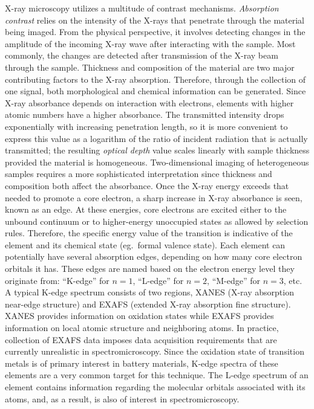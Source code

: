 \documentclass[journal=cmatex,manuscript=perspective]{achemso}
\begin{document}
X-ray microscopy utilizes a multitude of contrast
mechanisms. \emph{Absorption contrast} relies on the intensity of the X-rays
that penetrate through the material being imaged. From the physical
perspective, it involves detecting changes in the amplitude of the
incoming X-ray wave after interacting with the sample. Most commonly,
the changes are detected after transmission of the X-ray beam through
the sample. Thickness and composition of the material are two major
contributing factors to the X-ray absorption. Therefore, through the
collection of one signal, both morphological and chemical information
can be generated. Since X-ray absorbance depends on interaction with
electrons, elements with higher atomic numbers have a higher
absorbance. The transmitted intensity drops exponentially with
increasing penetration length, so it is more convenient to express
this value as a logarithm of the ratio of incident radiation that is
actually transmitted; the resulting \emph{optical depth} value scales linearly
with sample thickness provided the material is
homogeneous. Two-dimensional imaging of heterogeneous samples requires
a more sophisticated interpretation since thickness and composition
both affect the absorbance. Once the X-ray energy exceeds that needed
to promote a core electron, a sharp increase in X-ray absorbance is
seen, known as an edge. At these energies, core electrons are excited
either to the unbound continuum or to higher-energy unoccupied states
as allowed by selection rules. Therefore, the specific energy value of
the transition is indicative of the element and its chemical state
(eg.\ formal valence state). Each element can potentially have
several absorption edges, depending on how many core electron orbitals
it has. These edges are named based on the electron energy level they
originate from: ``K-edge'' for $n=1$, ``L-edge'' for $n=2$, ``M-edge''
for $n=3$, etc. A typical K-edge spectrum consists of two regions,
XANES (X-ray absorption near-edge structure) and EXAFS (extended X-ray
absorption fine structure). XANES provides information on oxidation
states while EXAFS provides information on local atomic structure and
neighboring atoms. In practice, collection of EXAFS data imposes data
acquisition requirements that are currently unrealistic in
spectromicroscopy. Since the oxidation state of transition metals is
of primary interest in battery materials, K-edge spectra of these
elements are a very common target for this technique. The L-edge
spectrum of an element contains information regarding the molecular
orbitals associated with its atoms, and, as a result, is also of
interest in spectromicroscopy.
\end{document}
